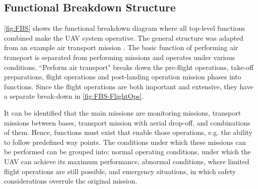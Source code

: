 \subsection{Functional Breakdown Structure}

\autoref{fig:FBS} shows the functional breakdown diagram where all top-level functions combined make the UAV system operative. The general structure was adapted from an example air transport mission \cite{SE_notes_2006}. The basic function of performing air transport is separated from performing missions and operates under various conditions. ``Perform air transport" breaks down the pre-flight operations, take-off preparations, flight operations and post-landing operation mission phases into functions. Since the flight operations are both important and extensive, they have a separate break-down in \autoref{fig:FBS-FlightOps}. 

It can be identified that the main missions are monitoring missions, transport missions between bases, transport mission with aerial drop-off, and combinations of them. Hence, functions must exist that enable those operations, e.g. the ability to follow predefined way points. The conditions under which these missions can be performed can be grouped into: normal operating conditions, under which the UAV can achieve its maximum performance, abnormal conditions, where limited flight operations are still possible, and emergency situations, in which safety considerations overrule the original mission. 


